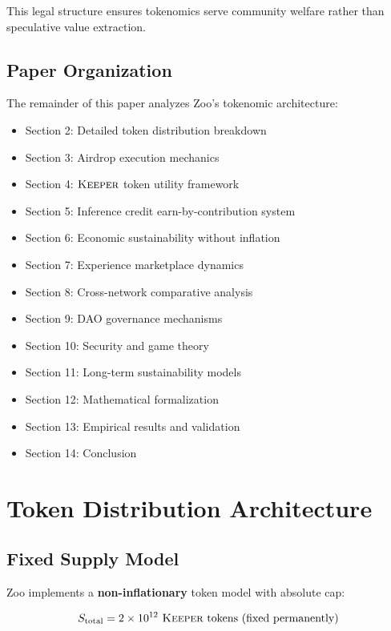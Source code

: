 \documentclass[11pt,letterpaper]{article}
\theoremstyle{definition}
\theoremstyle{remark}
\newcommand{\KEEPER}{\textsc{Keeper}}
\begin{document}
This legal structure ensures tokenomics serve community welfare rather than speculative value extraction.

\subsection{Paper Organization}

The remainder of this paper analyzes Zoo's tokenomic architecture:

\begin{itemize}
\item Section 2: Detailed token distribution breakdown
\item Section 3: Airdrop execution mechanics
\item Section 4: $\KEEPER$ token utility framework
\item Section 5: Inference credit earn-by-contribution system
\item Section 6: Economic sustainability without inflation
\item Section 7: Experience marketplace dynamics
\item Section 8: Cross-network comparative analysis
\item Section 9: DAO governance mechanisms
\item Section 10: Security and game theory
\item Section 11: Long-term sustainability models
\item Section 12: Mathematical formalization
\item Section 13: Empirical results and validation
\item Section 14: Conclusion
\end{itemize}

\section{Token Distribution Architecture}

\subsection{Fixed Supply Model}

Zoo implements a \textbf{non-inflationary} token model with absolute cap:

\begin{equation}
S_{\text{total}} = 2 \times 10^{12} \text{ } \KEEPER \text{ tokens (fixed permanently)}
\end{equation}
\end{document}
